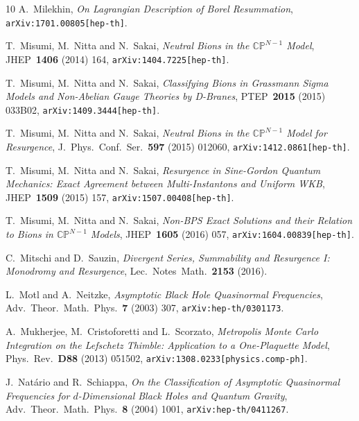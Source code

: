 \documentclass[11pt,a4paper]{article}
\def\BC{{\mathbb C}}
\def\BP{{\mathbb P}}
\begin{document}
\begin{thebibliography}{10}
A.~Milekhin,
\textit{On Lagrangian Description of Borel Resummation},
\texttt{arXiv:1701.00805[hep-th]}.

T.~Misumi, M.~Nitta and N.~Sakai,
\textit{Neutral Bions in the $\BC\BP^{N-1}$ Model},
JHEP\ \textbf{1406} (2014) 164,
\texttt{arXiv:1404.7225[hep-th]}.

T.~Misumi, M.~Nitta and N.~Sakai,
\textit{Classifying Bions in Grassmann Sigma Models and Non-Abelian Gauge Theories by D-Branes},
PTEP\ \textbf{2015} (2015) 033B02,
\texttt{arXiv:1409.3444[hep-th]}.

T.~Misumi, M.~Nitta and N.~Sakai,
\textit{Neutral Bions in the $\BC\BP^{N-1}$ Model for Resurgence},
J.\ Phys.\ Conf.\ Ser.\ \textbf{597} (2015) 012060,
\texttt{arXiv:1412.0861[hep-th]}.

T.~Misumi, M.~Nitta and N.~Sakai,
\textit{Resurgence in Sine-Gordon Quantum Mechanics: Exact Agreement between Multi-Instantons and Uniform WKB},
JHEP\ \textbf{1509} (2015) 157,
\texttt{arXiv:1507.00408[hep-th]}.

T.~Misumi, M.~Nitta and N.~Sakai,
\textit{Non-BPS Exact Solutions and their Relation to Bions in $\BC\BP^{N-1}$ Models},
JHEP\ \textbf{1605} (2016) 057,
\texttt{arXiv:1604.00839[hep-th]}.

C.~Mitschi and D.~Sauzin,
\textit{Divergent Series, Summability and Resurgence I: Monodromy and Resurgence},
Lec.\ Notes\ Math.\ \textbf{2153} (2016).

L.~Motl and A.~Neitzke,
\textit{Asymptotic Black Hole Quasinormal Frequencies},
Adv.\ Theor.\ Math.\ Phys.\ \textbf{7} (2003) 307,
\texttt{arXiv:hep-th/0301173}.

A.~Mukherjee, M.~Cristoforetti and L.~Scorzato,
\textit{Metropolis Monte Carlo Integration on the Lefschetz Thimble: Application to a One-Plaquette Model},
Phys.\ Rev.\ \textbf{D88} (2013) 051502,
\texttt{arXiv:1308.0233[physics.comp-ph]}.

J.~Nat\'ario and R.~Schiappa,
\textit{On the Classification of Asymptotic Quasinormal Frequencies for $d$-Dimensional Black Holes and Quantum Gravity},
Adv.\ Theor.\ Math.\ Phys.\ \textbf{8} (2004) 1001,
\texttt{arXiv:hep-th/0411267}.


\end{thebibliography}
\end{document}
